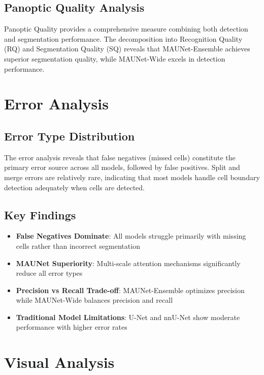 \documentclass[11pt,a4paper]{article}
\begin{document}
\subsection{Panoptic Quality Analysis}


Panoptic Quality provides a comprehensive measure combining both detection and segmentation performance. The decomposition into Recognition Quality (RQ) and Segmentation Quality (SQ) reveals that MAUNet-Ensemble achieves superior segmentation quality, while MAUNet-Wide excels in detection performance.

\section{Error Analysis}

\subsection{Error Type Distribution}




The error analysis reveals that false negatives (missed cells) constitute the primary error source across all models, followed by false positives. Split and merge errors are relatively rare, indicating that most models handle cell boundary detection adequately when cells are detected.

\subsection{Key Findings}
\begin{itemize}
\item \textbf{False Negatives Dominate}: All models struggle primarily with missing cells rather than incorrect segmentation
\item \textbf{MAUNet Superiority}: Multi-scale attention mechanisms significantly reduce all error types
\item \textbf{Precision vs Recall Trade-off}: MAUNet-Ensemble optimizes precision while MAUNet-Wide balances precision and recall
\item \textbf{Traditional Model Limitations}: U-Net and nnU-Net show moderate performance with higher error rates
\end{itemize}

\section{Visual Analysis}
\end{document}
